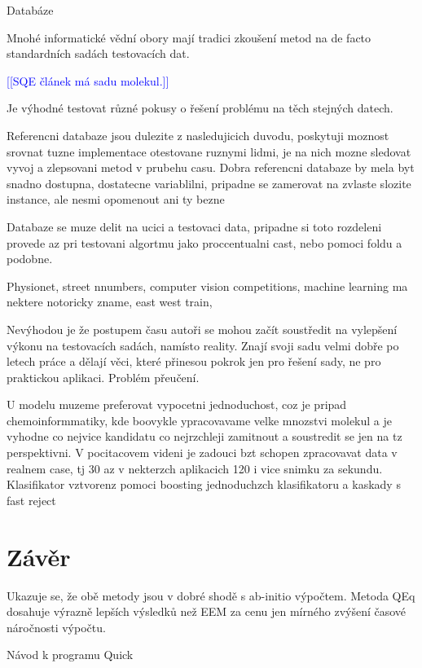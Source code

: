 \documentclass[10pt,draft,oneside]{fithesis2}
\newcommand\todo[1]{\textcolor{blue}{[[#1]]}}
\begin{document}
Databáze

Mnohé informatické vědní obory mají tradici zkoušení metod na de facto standardních sadách testovacích dat.

\todo{SQE článek má sadu molekul.}

Je výhodné testovat různé pokusy o řešení problému na těch stejných datech.

Referencni databaze jsou dulezite z nasledujicich duvodu, poskytuji moznost srovnat tuzne implementace otestovane ruznymi lidmi, je na nich mozne sledovat vyvoj a zlepsovani metod v prubehu casu. Dobra referencni databaze by mela byt snadno dostupna, dostatecne variablilni, pripadne se zamerovat na zvlaste slozite instance, ale nesmi opomenout ani ty bezne

Databaze se muze delit na ucici a testovaci data, pripadne si toto rozdeleni provede az pri testovani algortmu jako proccentualni cast, nebo pomoci foldu a podobne.

Physionet, street nnumbers, computer vision competitions, machine learning ma nektere notoricky zname, east west train,

Nevýhodou je že postupem času autoři se mohou začít soustředit na vylepšení výkonu na testovacích sadách, namísto reality. Znají svoji sadu velmi dobře po letech práce a dělají věci, které přinesou pokrok jen pro řešení sady, ne pro praktickou aplikaci. Problém přeučení.

U modelu muzeme preferovat vypocetni jednoduchost, coz je pripad chemoinformmatiky, kde boovykle ypracovavame velke mnozstvi molekul a je vyhodne co nejvice kandidatu co nejrzchleji zamitnout a soustredit se jen na tz perspektivni. V pocitacovem videni je zadouci bzt schopen zpracovavat data v realnem case, tj 30 az v nekterzch aplikacich 120 i vice snimku za sekundu. Klasifikator vztvorenz pomoci boosting jednoduchzch klasifikatoru a kaskady s fast reject

\chapter{Závěr}

Ukazuje se, že obě metody jsou v dobré shodě s ab-initio výpočtem. Metoda QEq dosahuje výrazně lepších výsledků než EEM za cenu jen mírného zvýšení časové náročnosti výpočtu.


%



\appendix

Návod k programu Quick

\end{document}
